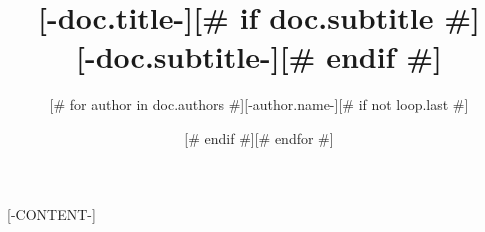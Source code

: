 \documentclass[11pt,a4paper,openany]{book}
\title{[-doc.title-][# if doc.subtitle #]\\[1ex]\large [-doc.subtitle-][# endif #]}
\author{[# for author in doc.authors #][-author.name-][# if not loop.last #] \and [# endif #][# endfor #]}
\date{}
\begin{document}
\frontmatter
\maketitle
\tableofcontents
\mainmatter

[-CONTENT-]
\end{document}
